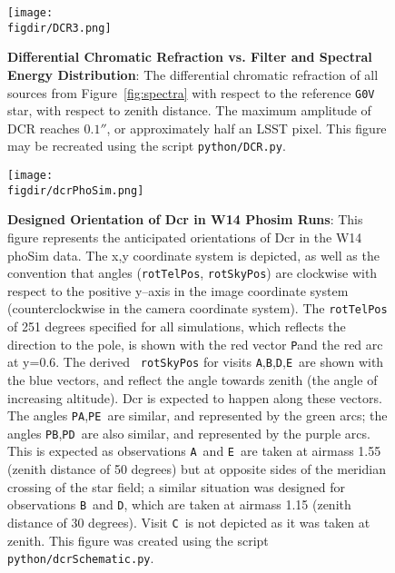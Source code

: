 \documentclass[prd, nofootinbib, floatfix, 11pt, tightenlines, times]{article}
\def\figdir{../figures}
\def\A{{\tt A}}
\def\B{{\tt B}}
\def\C{{\tt C}}
\def\D{{\tt D}}
\def\E{{\tt E}}
\def\P{{\tt P}}
\begin{document}
\clearpage
\begin{figure}[h!]
  \centering
  \texttt{[image: \\figdir/DCR3.png]}
  \caption{{\bf Differential Chromatic Refraction vs. Filter and
      Spectral Energy Distribution}: The differential chromatic
    refraction of all sources from Figure~\ref{fig:spectra} with
    respect to the reference {\tt G0V} star, with respect to zenith
    distance.  The maximum amplitude of DCR reaches $0.1''$, or
    approximately half an LSST pixel.  This figure may be recreated
    using the script {\tt python/DCR.py}.}
  \label{fig:dcr}
\end{figure}

\begin{figure}[h!]
  \centering
  \texttt{[image: \\figdir/dcrPhoSim.png]}
  \caption{{\bf Designed Orientation of Dcr in W14 Phosim Runs}: This
    figure represents the anticipated orientations of Dcr in the W14
    phoSim data.  The x,y coordinate system is depicted, as well as
    the convention that angles ({\tt rotTelPos}, {\tt rotSkyPos}) are
    clockwise with respect to the positive y--axis in the image
    coordinate system (counterclockwise in the camera coordinate
    system).  The {\tt rotTelPos} of 251 degrees specified for all
    simulations, which reflects the direction to the pole, is shown
    with the red vector \P and the red arc at y=0.6.  The derived {\tt
      rotSkyPos} for visits \A,\B,\D,\E\ are shown with the blue
    vectors, and reflect the angle towards zenith (the angle of
    increasing altitude).  Dcr is expected to happen along these
    vectors.  The angles \P\A,\P\E\ are similar, and represented by
    the green arcs; the angles \P\B,\P\D\ are also similar, and
    represented by the purple arcs.  This is expected as observations
    \A\ and \E\ are taken at airmass 1.55 (zenith distance of 50
    degrees) but at opposite sides of the meridian crossing of the
    star field; a similar situation was designed for observations
    \B\ and \D, which are taken at airmass 1.15 (zenith distance of 30
    degrees).  Visit \C\ is not depicted as it was taken at zenith.
    This figure was created using the script {\tt
      python/dcrSchematic.py}.}
  \label{fig:phosimdcr}
\end{figure}
\end{document}
